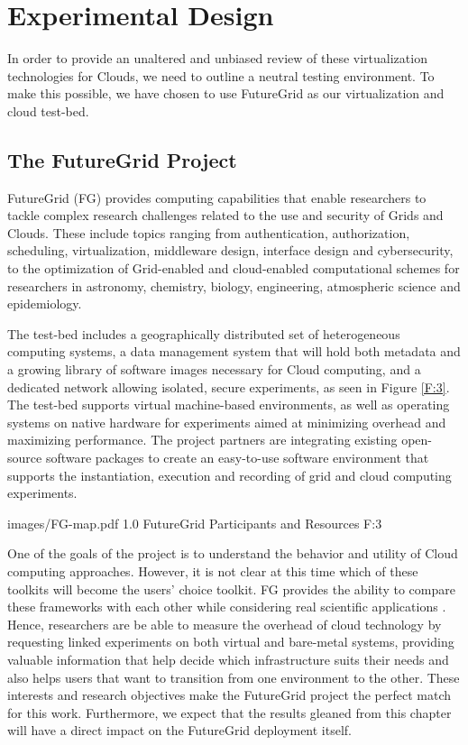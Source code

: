 \section{Experimental Design}

In order to provide an unaltered and unbiased review of these virtualization technologies for Clouds, we need to outline a neutral testing environment.  To make this possible, we have chosen to use FutureGrid as our virtualization and cloud test-bed.  


\subsection{The FutureGrid Project}

FutureGrid (FG) \cite{www-fg} provides computing capabilities that enable researchers to tackle complex research challenges related to the use and security of Grids and Clouds. These include topics ranging from authentication, authorization, scheduling, virtualization, middleware design, interface design and cybersecurity, to the optimization of Grid-enabled and cloud-enabled computational schemes for researchers in astronomy, chemistry, biology, engineering, atmospheric science and epidemiology. 

The test-bed includes a geographically distributed set of heterogeneous computing systems, a data management system that will hold both metadata and a growing library of software images necessary for Cloud computing, and a dedicated network allowing isolated, secure experiments, as seen in Figure \ref{F:3}. The test-bed supports virtual machine-based environments, as well as operating systems on native hardware for experiments aimed at minimizing overhead and maximizing performance. The project partners are integrating existing open-source software packages to create an easy-to-use software environment that supports the instantiation, execution and recording of grid and cloud computing experiments.


  {images/FG-map.pdf}
  {1.0}
  {FutureGrid Participants and Resources}
  {F:3}


One of the goals of the project is to understand the behavior and utility of Cloud computing approaches.  However, it is not clear at this time which of these toolkits will become the users' choice toolkit. FG provides the ability to compare these frameworks with each other while considering real scientific applications \cite{las2010gce}. Hence, researchers are be able to measure the overhead of cloud technology by requesting linked experiments on both virtual and bare-metal systems, providing valuable information that help decide which infrastructure suits their needs and also helps users that want to transition from one environment to the other.  These interests and research objectives make the FutureGrid project the perfect match for this work.  Furthermore, we expect that the results gleaned from this chapter will have a direct impact on the FutureGrid deployment itself.  

